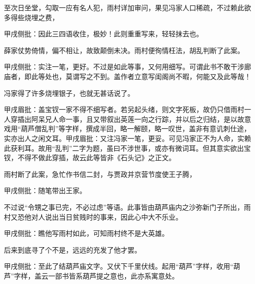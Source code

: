 \begin{parag}
    至次日坐堂，勾取一应有名人犯，雨村详加审问，果见冯家人口稀疏，不过赖此欲多得些烧埋之费，\begin{note}甲戌侧批：因此三四语收住，极妙！此则重重写来，轻轻抹去也。\end{note}薛家仗势倚情，偏不相让，故致颠倒未决。雨村便徇情枉法，胡乱判断了此案。\begin{note}甲戌侧批：实注一笔，更好。不过是如此等事，又何用细写。可谓此书不敢干涉廊庙者，即此等处也，莫谓写之不到。盖作者立意写闺阁尚不暇，何能又及此等哉！\end{note}冯家得了许多烧埋银子，也就无甚话说了。\begin{note}甲戌眉批：盖宝钗一家不得不细写者。若另起头绪，则文字死板，故仍只借雨村一人穿插出阿呆兄人命一事，且又带叙出英莲一向之行踪，并以后之归结，是以故意戏用“葫芦僧乱判”等字样，撰成半回，略一解颐，略一叹世，盖非有意讥刺仕途，实亦出人之闲文耳。甲戌眉批：又注冯家一笔，更妥。可见冯家正不为人命，实赖此获利耳。故用“乱判”二字为题，虽曰不涉世事，或亦有微词耳。但其意实欲出宝钗，不得不做此穿插，故云此等皆非《石头记》之正文。\end{note}雨村断了此案，急忙作书信二封，与贾政并京营节度使王子腾，\begin{note}甲戌侧批：随笔带出王家。\end{note}不过说“令甥之事已完，不必过虑”等语。此事皆由葫芦庙内之沙弥新门子所出，雨村又恐他对人说出当日贫贱时的事来，因此心中大不乐业。\begin{note}甲戌侧批：瞧他写雨村如此，可知雨村终不是大英雄。\end{note}后来到底寻了个不是，远远的充发了他才罢。\begin{note}甲戌侧批：至此了结葫芦庙文字。又伏下千里伏线。起用“葫芦”字样，收用“葫芦”字样，盖云一部书皆系葫芦提之意也，此亦系寓意处。\end{note}
\end{parag}


